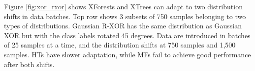Figure \ref{fig:xor_rxor} shows XForests and XTrees can adapt to two distribution shifts in data batches. Top row shows 3 subsets of 750 samples belonging to two types of distributions. Gaussian R-XOR has the same distribution as Gaussian XOR but with the class labels rotated 45 degrees. Data are introduced in batches of 25 samples at a time, and the distribution shifts at 750 samples and 1,500 samples. HTs have slower adaptation, while MFs fail to achieve good performance after both shifts.